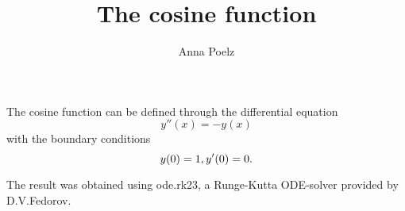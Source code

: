 \documentclass{article}
\title{The cosine function}
\author{Anna Poelz}
\begin{document}
\maketitle
The cosine function can be defined through the differential equation
\begin{equation}
	y''(x)=-y(x)
\end{equation}
with the boundary conditions
\begin{equation}
	y(0)=1,\\
	y'(0)=0.
\end{equation}

The result was obtained using ode.rk23, a Runge-Kutta ODE-solver provided by D.V.Fedorov. 

\begin{figure}[h]
	
\end{figure}
\end{document}
